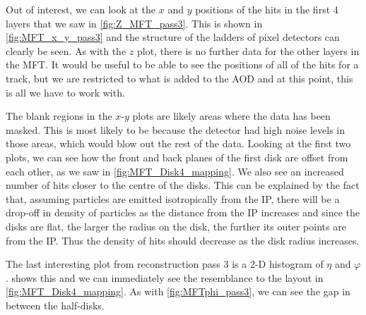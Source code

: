 \bigskip

Out of interest, we can look at the $x$ and $y$ positions of the hits in the first 4 layers that we saw in \cref{fig:Z_MFT_pass3}. This is shown in \cref{fig:MFT_x_y_pass3} and the structure of the ladders of pixel detectors can clearly be seen. As with the $z$ plot, there is no further data for the other layers in the MFT. It would be useful to be able to see the positions of all of the hits for a track, but we are restricted to what is added to the AOD and at this point, this is all we have to work with. 

The blank regions in the $x$-$y$ plots are likely areas where the data has been masked. This is most likely to be because the detector had high noise levels in those areas, which would blow out the rest of the data. Looking at the first two plots, we can see how the front and back planes of the first disk are offset from each other, as we saw in \cref{fig:MFT_Disk4_mapping}. We also see an increased number of hits closer to the centre of the disks. This can be explained by the fact that, assuming particles are emitted isotropically from the IP, there will be a drop-off in density of particles as the distance from the IP increases and since the disks are flat, the larger the radius on the disk, the further its outer points are from the IP. Thus the density of hits should decrease as the disk radius increases. 

\bigskip

The last interesting plot from reconstruction pass 3 is a 2-D histogram of $\eta$ and $\varphi$.  shows this and we can immediately see the resemblance to the layout in \cref{fig:MFT_Disk4_mapping}. As with \cref{fig:MFTphi_pass3}, we can see the gap in between the half-disks. 

